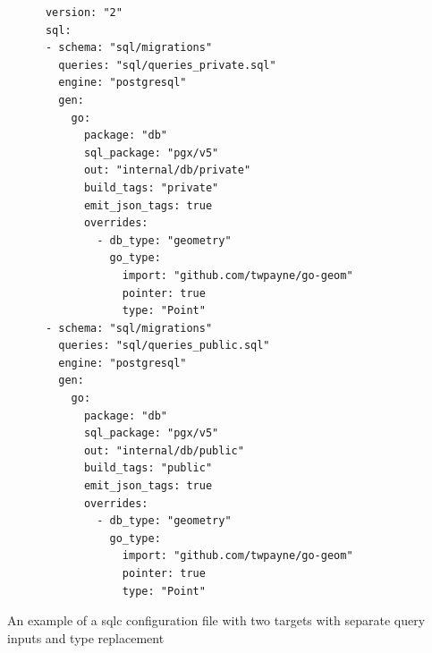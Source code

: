 \begin{listing}[htbp]
  \centering{}
  \begin{minipage}{0.75\textwidth}
  \begin{verbatim}
      version: "2"
      sql:
      - schema: "sql/migrations"
        queries: "sql/queries_private.sql"
        engine: "postgresql"
        gen:
          go:
            package: "db"
            sql_package: "pgx/v5"
            out: "internal/db/private"
            build_tags: "private"
            emit_json_tags: true
            overrides:
              - db_type: "geometry"
                go_type:
                  import: "github.com/twpayne/go-geom"
                  pointer: true
                  type: "Point"
      - schema: "sql/migrations"
        queries: "sql/queries_public.sql"
        engine: "postgresql"
        gen:
          go:
            package: "db"
            sql_package: "pgx/v5"
            out: "internal/db/public"
            build_tags: "public"
            emit_json_tags: true
            overrides:
              - db_type: "geometry"
                go_type:
                  import: "github.com/twpayne/go-geom"
                  pointer: true
                  type: "Point"
  \end{verbatim}
  \end{minipage}
  \caption{An example of a sqlc configuration file with two targets with separate query inputs and type replacement}
  \label{listing:sqlc_config_file}
\end{listing}

